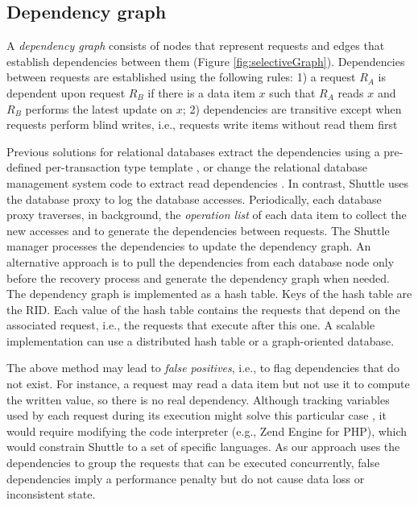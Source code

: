 \subsection{Dependency graph}
\label{sec:recovery:dependencies}

A \emph{dependency graph} consists of nodes that represent requests and edges that establish dependencies between them (Figure \ref{fig:selectiveGraph}). Dependencies between requests are established using the following rules: 1) a request $R_A$ is dependent upon request $R_B$ if there is a data item $x$ such that $R_A$ reads $x$ and $R_B$ performs the latest update on $x$; 2) dependencies are transitive except when requests perform blind writes, i.e., requests write items without read them first \cite{itdb}

Previous solutions for relational databases extract the dependencies using a pre-defined per-transaction type template \cite{itdb} , or change the relational database management system code to extract read dependencies \cite{phoenix}. In contrast, Shuttle uses the database proxy to log the database accesses. Periodically, each database proxy traverses, in background, the \emph{operation list} of each data item to collect the new accesses and to generate the dependencies between requests. The Shuttle manager processes the dependencies to update the dependency graph. An alternative approach is to pull the dependencies from each database node only before the recovery process and generate the dependency graph when needed. The dependency graph is implemented as a hash table. Keys of the hash table are the \acf{RID}. Each value of the hash table contains the requests that depend on the associated request, i.e., the requests that execute after this one. A scalable implementation can use a distributed hash table or a graph-oriented database.

The above method may lead to \emph{false positives}, i.e., to flag dependencies that do not exist. For instance, a request may read a data item but not use it to compute the written value, so there is no real dependency. Although tracking variables used by each request during its execution might solve this particular case \cite{goel}, it would require modifying the code interpreter (e.g., Zend Engine for PHP), which would constrain Shuttle to a set of specific languages. As our approach uses the dependencies to group the requests that can be executed concurrently, false dependencies imply a performance penalty but do not cause data loss or inconsistent state.

